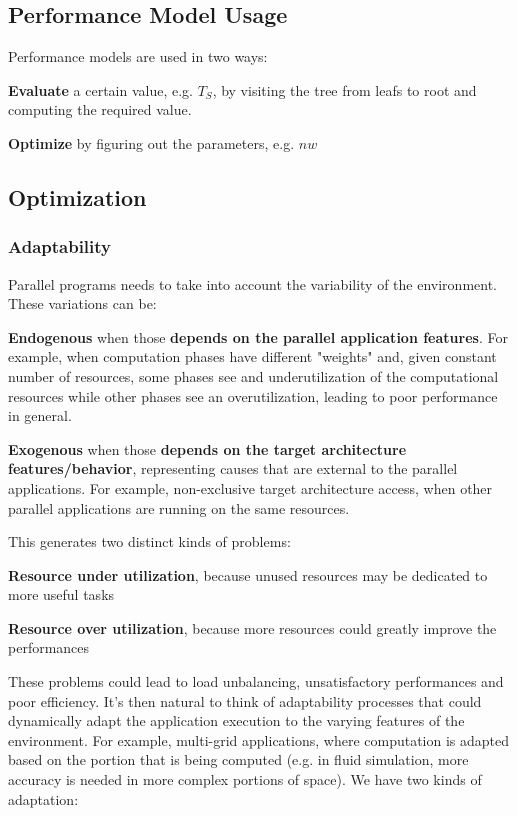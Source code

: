 \documentclass[10pt]{report}
\begin{document}
\subsection{Performance Model Usage}
Performance models are used in two ways:
\begin{list}{}{}
	\item \textbf{Evaluate} a certain value, e.g. $T_S$, by visiting the tree from leafs to root and computing the required value.
	\item \textbf{Optimize} by figuring out the parameters, e.g. $nw$
\end{list}
\subsection{Optimization}
\subsubsection{Adaptability}
Parallel programs needs to take into account the variability of the environment. These variations can be:
\begin{list}{}{}
	\item \textbf{Endogenous} when those \textbf{depends on the parallel application features}. For example, when computation phases have different "weights" and, given constant number of resources, some phases see and underutilization of the computational resources while other phases see an overutilization, leading to poor performance in general.
	\item \textbf{Exogenous} when those \textbf{depends on the target architecture features/behavior}, representing causes that are external to the parallel applications. For example, non-exclusive target architecture access, when other parallel applications are running on the same resources.
\end{list}
This generates two distinct kinds of problems:
\begin{list}{}{}
	\item \textbf{Resource under utilization}, because unused resources may be dedicated to more useful tasks
	\item \textbf{Resource over utilization}, because more resources could greatly improve the performances
\end{list}
These problems could lead to load unbalancing, unsatisfactory performances and poor efficiency. It's then natural to think of adaptability processes that could dynamically adapt the application execution to the varying features of the environment. For example, multi-grid applications, where computation is adapted based on the portion that is being computed (e.g. in fluid simulation, more accuracy is needed in more complex portions of space). We have two kinds of adaptation:
\end{document}
